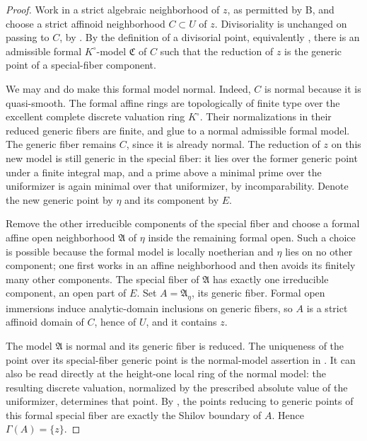 \documentclass[11pt,a4paper]{article}
\numberwithin{equation}{section}
\theoremstyle{definition}
\theoremstyle{remark}
\begin{document}
\begin{proof}
Work in a strict algebraic neighborhood of $z$, as permitted by
\textup{B}, and choose a strict affinoid neighborhood $C\subset U$
of $z$. Divisoriality is unchanged on passing to $C$, by
\cite[Corollary~A.6, p.~367]{GM19}. By the definition of a divisorial
point, equivalently \cite[Proposition~A.5, pp.~366--367]{GM19}, there
is an admissible formal $K^\circ$-model $\mathfrak C$ of $C$ such
that the reduction of $z$ is the generic point of a special-fiber
component.

We may and do make this formal model normal. Indeed, $C$ is normal
because it is quasi-smooth. The formal affine rings are topologically
of finite type over the excellent complete discrete valuation ring
$K^\circ$. Their normalizations in their reduced generic fibers are
finite, and glue to a normal admissible formal model. The generic
fiber remains $C$, since it is already normal. The reduction of $z$
on this new model is still generic in the special fiber: it lies
over the former generic point under a finite integral map, and a
prime above a minimal prime over the uniformizer is again minimal
over that uniformizer, by incomparability. Denote the new generic
point by $\eta$ and its component by $E$.

Remove the other irreducible components of the special fiber and
choose a formal affine open neighborhood $\mathfrak A$ of $\eta$
inside the remaining formal open. Such a choice is possible because
the formal model is locally noetherian and $\eta$ lies on no other
component; one first works in an affine neighborhood and then avoids
its finitely many other components. The special fiber of
$\mathfrak A$ has exactly one irreducible component, an open part
of $E$. Set $A=\mathfrak A_\eta$, its generic fiber. Formal open
immersions induce analytic-domain inclusions on generic fibers, so
$A$ is a strict affinoid domain of $C$, hence of $U$, and it contains
$z$.

The model $\mathfrak A$ is normal and its generic fiber is reduced.
The uniqueness of the point over its special-fiber generic point is
the normal-model assertion in
\cite[Proposition~6.9.7, pp.~119--120]{CLD12}. It can also be read
directly at the height-one local ring of the normal model: the
resulting discrete valuation, normalized by the prescribed absolute
value of the uniformizer, determines that point. By
\cite[Proposition~A.3, p.~365]{GM19}, the points reducing to generic
points of this formal special fiber are exactly the Shilov boundary
of $A$. Hence $\Gamma(A)=\{z\}$.


\end{proof}
\end{document}

